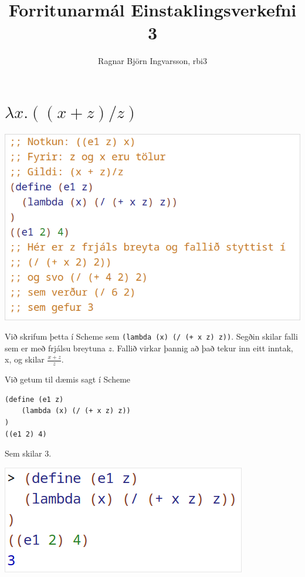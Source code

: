 \documentclass{article}
\title{Forritunarmál Einstaklingsverkefni 3}
\author{Ragnar Björn Ingvarsson, rbi3}
\begin{document}
\renewcommand\thepage{}
	
	\maketitle

	\newpage
	\setcounter{page}{1}
	\renewcommand\thepage{\arabic{page}}

	\section{$\lambda x.((x + z) / z)$}
	\includegraphics[scale=0.3]{e1.png}

	Við skrifum þetta í Scheme sem \texttt{(lambda (x) (/ (+ x z) z))}. 
	Segðin skilar falli sem er með frjálsu breytuna $z$. Fallið virkar 
	þannig að það tekur inn eitt inntak, x, og skilar $\frac{x + z}{z}$.

	Við getum til dæmis sagt í Scheme

	\begin{verbatim}
(define (e1 z)
	(lambda (x) (/ (+ x z) z))
)
((e1 2) 4)
	\end{verbatim}

	Sem skilar $3$.

	\begin{center}
		\includegraphics[scale=0.375]{z.png}
	\end{center}
\end{document}
